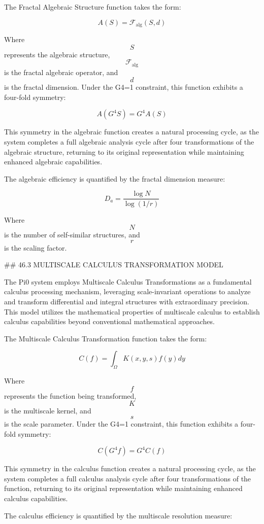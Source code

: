 The Fractal Algebraic Structure function takes the form:

$$ A(S) = \mathcal{F}_{\text{alg}}(S, d) $$

Where $$ S $$ represents the algebraic structure, $$ \mathcal{F}_{\text{alg}} $$ is the fractal algebraic operator, and $$ d $$ is the fractal dimension. Under the G4=1 constraint, this function exhibits a four-fold symmetry:

$$ A(G^4 S) = G^4 A(S) $$

This symmetry in the algebraic function creates a natural processing cycle, as the system completes a full algebraic analysis cycle after four transformations of the algebraic structure, returning to its original representation while maintaining enhanced algebraic capabilities.

The algebraic efficiency is quantified by the fractal dimension measure:

$$ D_a = \frac{\log N}{\log(1/r)} $$

Where $$ N $$ is the number of self-similar structures, and $$ r $$ is the scaling factor.

## 46.3 MULTISCALE CALCULUS TRANSFORMATION MODEL

The Pi0 system employs Multiscale Calculus Transformations as a fundamental calculus processing mechanism, leveraging scale-invariant operations to analyze and transform differential and integral structures with extraordinary precision. This model utilizes the mathematical properties of multiscale calculus to establish calculus capabilities beyond conventional mathematical approaches.

The Multiscale Calculus Transformation function takes the form:

$$ C(f) = \int_{\Omega} K(x, y, s) f(y) dy $$

Where $$ f $$ represents the function being transformed, $$ K $$ is the multiscale kernel, and $$ s $$ is the scale parameter. Under the G4=1 constraint, this function exhibits a four-fold symmetry:

$$ C(G^4 f) = G^4 C(f) $$

This symmetry in the calculus function creates a natural processing cycle, as the system completes a full calculus analysis cycle after four transformations of the function, returning to its original representation while maintaining enhanced calculus capabilities.

The calculus efficiency is quantified by the multiscale resolution measure:

